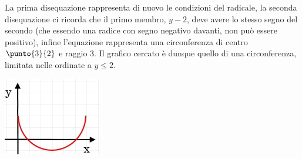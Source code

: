 \begin{esempio}
\noindent \begin{minipage}{.7\textwidth}
La prima disequazione rappresenta di nuovo le condizioni del 
radicale, la seconda disequazione ci ricorda che il primo membro, \(y-2\), deve 
avere lo stesso segno del secondo (che essendo una radice con segno 
negativo davanti, non può essere positivo), infine l'equazione rappresenta 
una circonferenza di centro \(\punto{3}{2}\) e raggio $3$. Il grafico cercato è dunque quello di una 
circonferenza, limitata nelle ordinate a 
$y\leq2$.
  \end{minipage}
  \hfill
  \begin{minipage}{.25\textwidth}
    \includegraphics[width=\textwidth]{img/curva2.jpg}
  \end{minipage}

\end{esempio}

